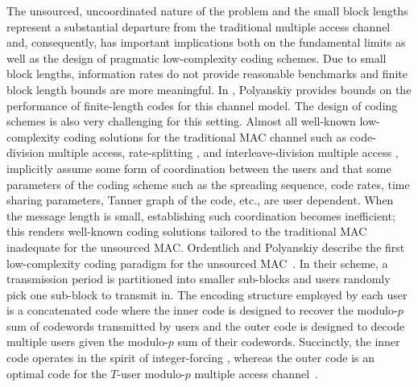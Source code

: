 The unsourced, uncoordinated nature of the problem and the small block lengths represent a substantial departure from the traditional multiple access channel and, consequently, has important implications both on the fundamental limits as well as the design of pragmatic low-complexity coding schemes. Due to small block lengths, information rates do not provide reasonable benchmarks and finite block length bounds are more meaningful. In \cite{polyanskiy2017perspective}, Polyanskiy provides bounds on the performance of finite-length codes for this channel model.
%
The design of coding schemes is also very challenging for this setting. Almost all well-known low-complexity coding solutions for the traditional MAC channel such as code-division multiple access, rate-splitting \cite{rimoldi1996rate}, and interleave-division multiple access \cite{ping2006interleave}, implicitly assume some form of coordination between the users and that some parameters of the coding scheme such as the spreading sequence, code rates, time sharing parameters, Tanner graph of the code, etc., are user dependent. When the message length is small, establishing such coordination becomes inefficient; this renders well-known coding solutions tailored to the traditional MAC inadequate for the unsourced MAC. Ordentlich and Polyanskiy describe the first low-complexity coding paradigm for the unsourced MAC~\cite{ordentlich2017low}. In their scheme, a transmission period is partitioned into smaller sub-blocks and users randomly pick one sub-block to transmit in. The encoding structure employed by each user is a concatenated code where the inner code is designed to recover the modulo-$p$ sum of codewords transmitted by users and the outer code is designed to decode multiple users given the modulo-$p$ sum of their codewords. Succinctly, the inner code operates in the spirit of integer-forcing \cite{zhan2014integer}, whereas the outer code is an optimal code for the $T$-user modulo-$p$ multiple access channel~\cite{mathys1990class}.

